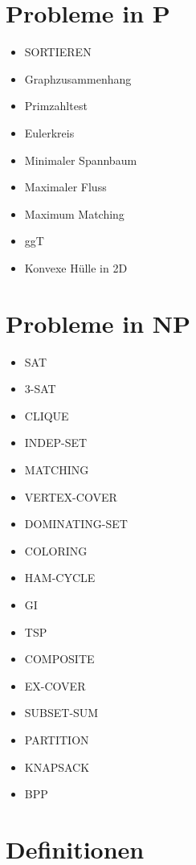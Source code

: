 \documentclass[a4paper,graphics,11pt]{article}
\begin{document}
\newpage

\section*{Probleme in \textsf{P}}

\begin{itemize}
    \item SORTIEREN
    \item Graphzusammenhang
    \item Primzahltest
    \item Eulerkreis
    \item Minimaler Spannbaum
    \item Maximaler Fluss
    \item Maximum Matching
    \item ggT
    \item Konvexe Hülle in 2D
\end{itemize}

\section*{Probleme in \textsf{NP}}

\begin{itemize}
    \item SAT
    \item 3-SAT
    \item CLIQUE
    \item INDEP-SET
    \item MATCHING
    \item VERTEX-COVER
    \item DOMINATING-SET
    \item COLORING
    \item HAM-CYCLE
    \item GI
    \item TSP
    \item COMPOSITE
    \item EX-COVER
    \item SUBSET-SUM
    \item PARTITION
    \item KNAPSACK
    \item BPP
\end{itemize}

\newpage

\section*{Definitionen}
\end{document}
